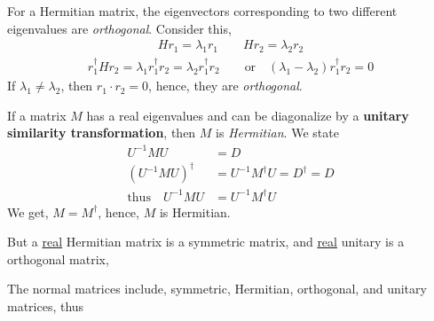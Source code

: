             \bulletpar For a Hermitian matrix, the eigenvectors corresponding to two different eigenvalues are \textit{orthogonal}. Consider  this,
            \begin{align*}
                H r_1 = \lambda_1 r_1 \qquad H r_2 = \lambda_2 r_2
            \end{align*}
            \begin{align*}
                r_1^\dagger H r_2 = \lambda_1 r_1^\dagger r_2 = \lambda_2 r_1^\dagger r_2 \qquad \text{or} \quad (\lambda_1 - \lambda_2) r_1^\dagger r_2 = 0
            \end{align*}
            If $\lambda_1 \neq \lambda_2$, then $r_1 \cdot r_2 = 0$, hence, they are \textit{orthogonal}.

            \starpar If a matrix $M$ has a real eigenvalues and can be diagonalize by a \textbf{unitary similarity transformation}, then $M$ is \textit{Hermitian}.
            We state 
            \begin{align*}
                U^{-1} M U &= D \\
                (U^{-1} M U)^\dagger &= U^{-1} M^\dagger U = D^\dagger = D \\
                \text{thus}\quad U^{-1} M U &= U^{-1} M^\dagger U
            \end{align*}
            We get, $M = M^\dagger$, hence, $M$ is Hermitian.
            
            But a \underline{real} Hermitian matrix is a symmetric matrix, and \underline{real} unitary is a orthogonal matrix, 
            
            The normal matrices include, symmetric, Hermitian, orthogonal, and unitary matrices, thus
            

